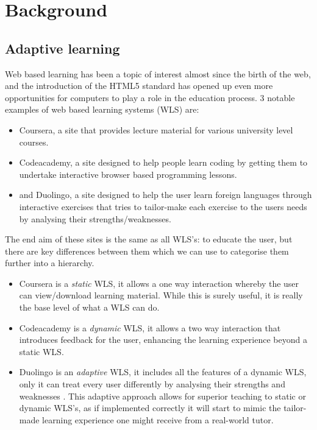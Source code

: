 \chapter{Background}
	\section{Adaptive learning}
	Web based learning has been a topic of interest almost since the birth of the web\cite{alexander1995teaching}, and the introduction of the HTML5 standard has opened up even more opportunities for computers to play a role in the education process\cite{griffiths2012profile}. 3 notable examples of web based learning systems (WLS) are:
	\begin{itemize}
		\item Coursera, a site that provides lecture material for various university level courses.
		\item  Codeacademy, a site designed to help people learn coding by getting them to undertake interactive browser based programming lessons.
		\item and Duolingo, a site designed to help the user learn foreign languages through interactive exercises that tries to tailor-make each exercise to the users needs by analysing their strengths/weaknesses.
	\end{itemize}
	The end aim of these sites is the same as all WLS's: to educate the user, but there are key differences between them which we can use to categorise them further into a hierarchy.
	\begin{itemize}
		\item Coursera is a \emph{static} WLS, it allows a one way interaction whereby the user can view/download learning material. While this is surely useful, it is really the base level of what a WLS can do.
		\item Codeacademy is a \emph{dynamic} WLS, it allows a two way interaction that introduces feedback for the user, enhancing the learning experience beyond a static WLS.
		\item Duolingo is an \emph{adaptive} WLS, it includes all the features of a dynamic WLS, only it can treat every user differently by analysing their strengths and weaknesses \cite{duolingoDataDriven}. This adaptive approach allows for superior teaching to static or dynamic WLS's, as if implemented correctly it will start to mimic the tailor-made learning experience one might receive from a real-world  tutor.
	\end{itemize}
	
